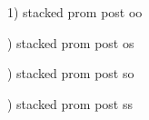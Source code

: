 \documentclass{article}
\begin{document}
1) stacked prom  post oo

\begin{center}

\end{center}

) stacked prom post os
\begin{center}

\end{center}

) stacked prom post so
\begin{center}

\end{center}

) stacked prom post ss
\begin{center}

\end{center}
\end{document}

